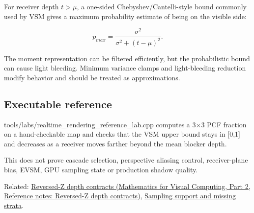 For receiver depth \(t>\mu\), a one-sided Chebyshev/Cantelli-style bound commonly used by VSM gives a maximum probability estimate of being on the visible side:

\[
p_{max}
=
\frac{\sigma^2}
{\sigma^2+(t-\mu)^2}.
\]

The moment representation can be filtered efficiently, but the probabilistic bound can cause light bleeding. Minimum variance clamps and light-bleeding reduction modify behavior and should be treated as approximations.

\subsection{Executable reference}\label{appendix-7cac8a689849-executable-reference}

\hypertarget{appendix-7cac8a689849-executable-reference}{}

tools/labs/realtime\_rendering\_reference\_lab.cpp computes a 3×3 PCF fraction on a hand-checkable map and checks that the VSM upper bound stays in {[}0,1{]} and decreases as a receiver moves farther beyond the mean blocker depth.

This does not prove cascade selection, perspective aliasing control, receiver-plane bias, EVSM, GPU sampling state or production shadow quality.

Related: \href{../02-Mathematics-for-Visual-Computing-P02/main.pdf\#appendix-275ec8847057}{Reversed-Z depth contracts (Mathematics for Visual Computing, Part 2, Reference notes: Reversed-Z depth contracts)}, \hyperref[appendix-10308c3d753e]{Sampling support and missing strata}.
